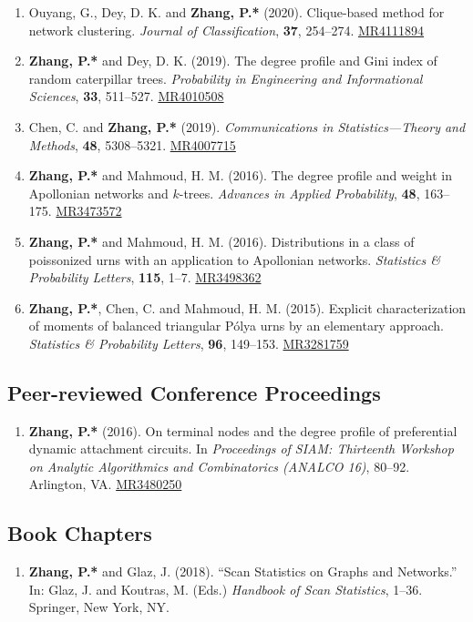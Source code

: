 \documentclass[margin]{res}
\def\MR#1{\href{http://www.ams.org/mathscinet-getitem?mr=#1}{MR#1}}
\begin{document}
\begin{resume}
\begin{enumerate}
	nodes of small degrees and degree profile in preferential 
	dynamic attachment circuits. {\em Methodology and Computing in 
	Applied Probability}, \textbf{22}, 625--645. \MR{4104007}
	\item {\sc Ouyang, G., Dey, D. K.} and {\bf Zhang, P.*} (2020). 
	Clique-based method for network clustering. {\em Journal of 
	Classification}, \textbf{37}, 254--274. \MR{4111894}
	\item {\bf Zhang, P.*} and {\sc Dey, D. K.} (2019). The degree 
	profile and Gini index of random caterpillar trees. {\em 
	Probability in Engineering and Informational Sciences}, 
	\textbf{33}, 511--527. \MR{4010508}
	\item {\sc Chen, C.} and {\bf Zhang, P.*} (2019). {\em 
	Communications in Statistics---Theory and Methods}, \textbf{48}, 
	5308--5321. \MR{4007715}
	\item {\bf Zhang, P.*} and {\sc Mahmoud, H. M.} (2016). The 
	degree profile and weight in Apollonian networks and $k$-trees. 
	\emph{Advances in Applied Probability}, \textbf{48}, 163--175. 
	\MR{3473572}
	\item {\bf Zhang, P.*} and {\sc Mahmoud, H. M.} (2016). 
	Distributions in a class of poissonized urns with an application 
	to Apollonian networks. \emph{Statistics \& Probability 
	Letters}, {\bf 115}, 1--7. \MR{3498362}
	\item {\bf Zhang, P.*}, {\sc Chen, C.} and {\sc Mahmoud, H. M.} 
	(2015). Explicit characterization of moments of balanced 
	triangular P\'{o}lya urns by an elementary approach. 
	\emph{Statistics \& Probability Letters}, {\bf 96}, 149--153. 
	\MR{3281759}
\end{enumerate} 

\subsection{Peer-reviewed Conference Proceedings}
\begin{enumerate}
	\item {\bf Zhang, P.*} (2016). On terminal nodes and the degree 
	profile of preferential dynamic attachment circuits. In 
	\emph{Proceedings of SIAM: Thirteenth Workshop on Analytic 
	Algorithmics and Combinatorics (ANALCO 16)}, 80--92. Arlington, 
	VA. \MR{3480250}
\end{enumerate}

\subsection{Book Chapters}
\begin{enumerate}
	\item {\bf Zhang, P.*} and {\sc Glaz, J.} (2018). ``Scan 
	Statistics on Graphs and Networks.'' In: Glaz, J. and Koutras, 
	M. (Eds.) {\em Handbook of Scan Statistics}, 1--36. Springer, 
	New York, NY. 
\end{enumerate}


\end{resume}
\end{document}
